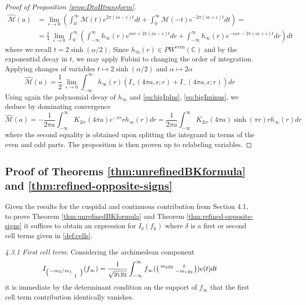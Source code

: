 \documentclass{article}
\numberwithin{equation}{section}
\begin{document}
\begin{proof}[Proof of Proposition \ref{prop:DtoHtransform}]
\begin{equation*}
        \begin{split}
            \widehat{\mathcal{M}}(a) & = \lim_{\epsilon \to 0}\left(\int_{0}^{\infty}\mathcal{M}(t)e^{2\pi (ia-\epsilon)t}dt+\int_{0}^{\infty}\mathcal{M}(-t)e^{-2\pi(ia+\epsilon)t}dt\right) = \\
            & =\frac{1}{4} \ \lim_{\epsilon \to 0} \int_{0}^{\infty}\left( \int_{-\infty}^{\infty}h_\infty(r)e^{i\alpha r+2\pi (ia-\epsilon)t}dr+\int_{-\infty}^{\infty}h_\infty(r)e^{-i\alpha r-2\pi(ia+\epsilon)t}dr\right)dt
        \end{split}
    \end{equation*}
    where we recall $t=2\sinh(\alpha/2)$. Since $h_\infty(r) \in PW^{\operatorname{even}}(\mathbb{C})$ and by the exponential decay in $t$, we may apply Fubini to changing the order of integration. Applying changes of variables $t\mapsto2\sinh(\alpha/2)$ and $\alpha \mapsto 2\alpha$
    $$\widehat{\mathcal{M}}(a)=\frac{1}{2}\ \lim_{\epsilon \to 0}\int_{-\infty}^{\infty}h_\infty(r)(I_+(4\pi a,\epsilon;r)+I_-(4\pi a,\epsilon;r))dr$$
   Using again the polynomial decay of $h_\infty$ and  \eqref{eq:bigIplus}, \eqref{eq:bigIminus}, we deduce by dominating convergence
   $$\widehat{\mathcal{M}}(a)=-\frac{1}{2\pi a}\int_{-\infty}^{\infty}K_{2ir}(4\pi a)e^{-\pi r }rh_\infty (r)dr = \frac{1}{2\pi a}\int_{-\infty}^{\infty}K_{2ir}(4\pi a)\sinh (\pi r)r h_\infty(r)dr$$
   where the second equality is obtained upon splitting the integrand in terms of the even and odd parts. The proposition is then proven up to relabeling variables.
\end{proof}

\subsection{Proof of Theorems \ref{thm:unrefinedBKformula} and \ref{thm:refined-opposite-signs}}
 Given the results for the cuspidal and continuous contribution from Section 4.1, to prove Theorem \ref{thm:unrefinedBKformula} and Theorem \ref{thm:refined-opposite-signs} it suffices to obtain an expression for $I_\delta(f_{\mathbb{A}})$ where $\delta$ is a first or second cell terms given in \eqref{def:cells}. \bigbreak 

\noindent \emph{4.3.1 First cell term}: Considering the archimedean component
\begin{equation}
    I_{\big(\begin{smallmatrix}
    -m_2/m_1 & \\ & 1
\end{smallmatrix}\ \big)}(f_\infty)=\frac{1}{\sqrt{y_1y_2}}\int_{-\infty}^{\infty}f_\infty(\begin{psmallmatrix}
    m_2y_2  & t \\ & -m_1y_2
\end{psmallmatrix})e(t)dt
\end{equation}
it is immediate by the determinant condition on the support of $f_\infty$ that the first cell term contribution identically vanishes. \bigbreak 
\end{document}
